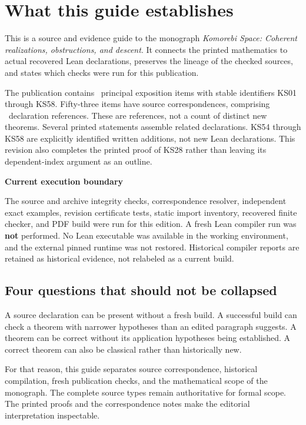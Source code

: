 \documentclass[11pt]{article}
\begin{document}
\KomorebiCover
\section*{What this guide establishes}
This is a source and evidence guide to the monograph \emph{Komorebi Space: Coherent realizations, obstructions, and descent}. It connects the printed mathematics to actual recovered Lean declarations, preserves the lineage of the checked sources, and states which checks were run for this publication.

The publication contains \EditionClaims\ principal exposition items with stable identifiers KS01 through KS58. Fifty-three items have source correspondences, comprising \EditionReferences\ declaration references. These are references, not a count of distinct new theorems. Several printed statements assemble related declarations. KS54 through KS58 are explicitly identified written additions, not new Lean declarations. This revision also completes the printed proof of KS28 rather than leaving its dependent-index argument as an outline.

\begin{scopebox}
\textbf{Current execution boundary}\par
The source and archive integrity checks, correspondence resolver, independent exact examples, revision certificate tests, static import inventory, recovered finite checker, and PDF build were run for this edition. A fresh Lean compiler run was \textbf{not} performed. No Lean executable was available in the working environment, and the external pinned runtime was not restored. Historical compiler reports are retained as historical evidence, not relabeled as a current build.
\end{scopebox}

\subsection*{Four questions that should not be collapsed}
A source declaration can be present without a fresh build. A successful build can check a theorem with narrower hypotheses than an edited paragraph suggests. A theorem can be correct without its application hypotheses being established. A correct theorem can also be classical rather than historically new.

For that reason, this guide separates source correspondence, historical compilation, fresh publication checks, and the mathematical scope of the monograph. The complete source types remain authoritative for formal scope. The printed proofs and the correspondence notes make the editorial interpretation inspectable.
\end{document}
